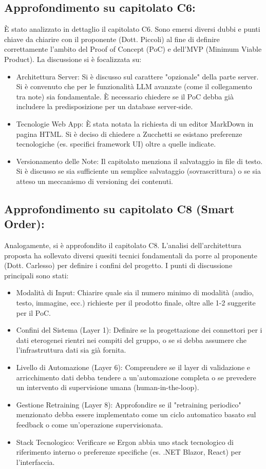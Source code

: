 \subsection{Approfondimento su capitolato C6:}
È stato analizzato in dettaglio il capitolato C6. Sono emersi diversi dubbi e punti chiave da chiarire con il proponente (Dott. Piccoli) al fine di definire correttamente l'ambito del Proof of Concept (PoC) e dell'MVP (Minimum Viable Product). 
La discussione si è focalizzata su:
\begin{itemize}
    \item Architettura Server: Si è discusso sul carattere "opzionale" della parte server. Si è convenuto che per le funzionalità LLM avanzate (come il collegamento tra note) sia fondamentale. È necessario chiedere se il PoC debba già includere la predisposizione per un database server-side.
    \item Tecnologie Web App: È stata notata la richiesta di un editor MarkDown in pagina HTML. Si è deciso di chiedere a Zucchetti se esistano preferenze tecnologiche (es. specifici framework UI) oltre a quelle indicate.
    \item Versionamento delle Note: Il capitolato menziona il salvataggio in file di testo. Si è discusso se sia sufficiente un semplice salvataggio (sovrascrittura) o se sia atteso un meccanismo di versioning dei contenuti.
\end{itemize}

\subsection{Approfondimento su capitolato C8 (Smart Order):}
Analogamente, si è approfondito il capitolato C8. L'analisi dell'architettura proposta ha sollevato diversi quesiti tecnici fondamentali da porre al proponente (Dott. Carlesso) per definire i confini del progetto. 
I punti di discussione principali sono stati:
\begin{itemize}
    \item Modalità di Input: Chiarire quale sia il numero minimo di modalità (audio, testo, immagine, ecc.) richieste per il prodotto finale, oltre alle 1-2 suggerite per il PoC.
    \item Confini del Sistema (Layer 1): Definire se la progettazione dei connettori per i dati eterogenei rientri nei compiti del gruppo, o se si debba assumere che l'infrastruttura dati sia già fornita.
    \item Livello di Automazione (Layer 6): Comprendere se il layer di validazione e arricchimento dati debba tendere a un'automazione completa o se prevedere un intervento di supervisione umana (human-in-the-loop).
    \item Gestione Retraining (Layer 8): Approfondire se il "retraining periodico" menzionato debba essere implementato come un ciclo automatico basato sul feedback o come un'operazione supervisionata.
    \item Stack Tecnologico: Verificare se Ergon abbia uno stack tecnologico di riferimento interno o preferenze specifiche (es. .NET Blazor, React) per l'interfaccia.
\end{itemize}
